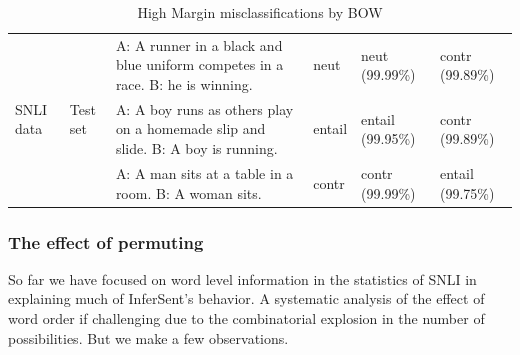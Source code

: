 \documentclass[10pt,letterpaper]{article}
\begin{document}
\begin{table}[ht!]
\begin{tabular}{||l|l|p{85mm}|l|p{15mm}|p{15mm}||}

  
\multirow{3}{*}{\parbox{1.2cm}{ SNLI data}} & \multirow{3}{*}{Test set } & A: A runner in a black and blue uniform competes in a race.\newline
 B: he is winning. & neut & neut (99.99\%) & contr (99.89\%) \\
 \cline{3-6}
&& A: A boy runs as others play on a homemade slip and slide. \newline
 B: A boy is running. & entail & entail (99.95\%) & contr (99.89\%) \\
 \cline{3-6}
 && A: A man sits at a table in a room. \newline
 B: A woman sits. & contr & contr (99.99\%) & entail (99.75\%) \\

 \hline
  \end{tabular}
  \caption{High Margin misclassifications by BOW}
  \label{tab:highMargin}
\end{table}


\subsubsection{The effect of permuting}
So far we have focused on word level information in the statistics of SNLI in explaining much of InferSent's behavior. A systematic analysis of the effect of word order if challenging due to the combinatorial explosion in the number of possibilities. But we make a few observations.
\end{document}
